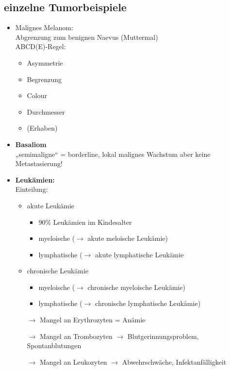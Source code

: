 	\subsection*{einzelne Tumorbeispiele}
		\begin{itemize}
			\item Malignes Melanom:\\
				Abgrenzung zum benignen Naevus (Muttermal)\\
				ABCD(E)-Regel:
				\begin{itemize}
					\item Asymmetrie
					\item Begrenzung
					\item Colour
					\item Durchmesser
					\item (Erhaben)
				\end{itemize}
			\item \textbf{Basaliom}\\
				„semimaligne“ = borderline, lokal malignes Wachstum aber keine Metastasierung!
			\item \textbf{Leukämien:}\\
				Einteilung:
				\begin{itemize}					
					\item akute Leukämie
						\begin{itemize}
							\item 90\% Leukämien im Kindesalter
							\item myeloische ($\rightarrow$ akute meloische Leukämie)
							\item lymphatische ($\rightarrow$ akute lymphatische Leukämie
						\end{itemize}
					\item chronische Leukämie
						\begin{itemize}
							\item myeloische ($\rightarrow$ chronische myeloische Leukämie)
							\item lymphatische ($\rightarrow$ chronische lymphatische Leukämie)
						\end{itemize}
					\item[$\rightarrow$] Mangel an Erythrozyten = Anämie
					\item[$\rightarrow$] Mangel an Trombozyten $\rightarrow$ Blutgerinnungsproblem, Spontanblutungen
					\item[$\rightarrow$] Mangel an Leukozyten $\rightarrow$ Abwehrschwäche, Infektanfälligkeit
				\end{itemize}

\end{itemize}
